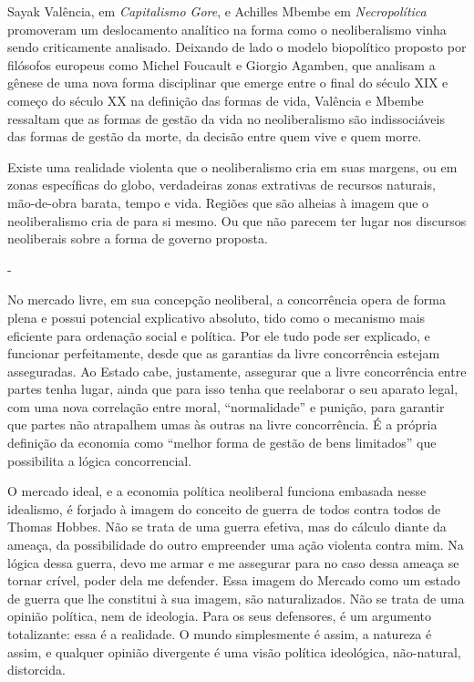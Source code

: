Sayak Valência, em \emph{Capitalismo Gore}, e Achilles Mbembe em
\emph{Necropolítica} promoveram um deslocamento analítico na forma como
o neoliberalismo vinha sendo criticamente analisado. Deixando de lado o
modelo biopolítico proposto por filósofos europeus como Michel Foucault
e Giorgio Agamben, que analisam a gênese de uma nova forma disciplinar
que emerge entre o final do século XIX e começo do século XX na
definição das formas de vida, Valência e Mbembe ressaltam que as formas
de gestão da vida no neoliberalismo são indissociáveis das formas de
gestão da morte, da decisão entre quem vive e quem morre.

Existe uma realidade violenta que o neoliberalismo cria em suas margens,
ou em zonas específicas do globo, verdadeiras zonas extrativas de
recursos naturais, mão-de-obra barata, tempo e vida. Regiões que são
alheias à imagem que o neoliberalismo cria de para si mesmo. Ou que não
parecem ter lugar nos discursos neoliberais sobre a forma de governo
proposta.

-

No mercado livre, em sua concepção neoliberal, a concorrência opera de
forma plena e possui potencial explicativo absoluto, tido como o
mecanismo mais eficiente para ordenação social e política. Por ele tudo
pode ser explicado, e funcionar perfeitamente, desde que as garantias da
livre concorrência estejam asseguradas. Ao Estado cabe, justamente,
assegurar que a livre concorrência entre partes tenha lugar, ainda que
para isso tenha que reelaborar o seu aparato legal, com uma nova
correlação entre moral, ``normalidade'' e punição, para garantir que
partes não atrapalhem umas às outras na livre concorrência. É a própria
definição da economia como ``melhor forma de gestão de bens limitados''
que possibilita a lógica concorrencial.

O mercado ideal, e a economia política neoliberal funciona embasada
nesse idealismo, é forjado à imagem do conceito de guerra de todos
contra todos de Thomas Hobbes. Não se trata de uma guerra efetiva, mas
do cálculo diante da ameaça, da possibilidade do outro empreender uma
ação violenta contra mim. Na lógica dessa guerra, devo me armar e me
assegurar para no caso dessa ameaça se tornar crível, poder dela me
defender. Essa imagem do Mercado como um estado de guerra que lhe
constitui à sua imagem, são naturalizados. Não se trata de uma opinião
política, nem de ideologia. Para os seus defensores, é um argumento
totalizante: essa é a realidade. O mundo simplesmente é assim, a
natureza é assim, e qualquer opinião divergente é uma visão política
ideológica, não-natural, distorcida.

